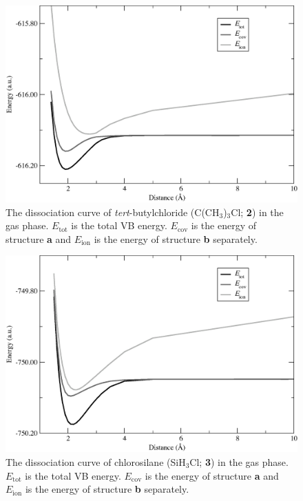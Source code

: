 \begin{figure}[hbtp]
\begin{center}
\includegraphics[scale=0.55]{dissociation/figures/c4h9cl_g.eps}
\end{center}
\caption{The dissociation curve of \textit{tert}-butylchloride (C(CH$_3$)$_3$Cl; \textbf{2}) in the gas phase. $E_\mathrm{tot}$ is the total VB energy. $E_\mathrm{cov}$ is the energy of structure \textbf{a} and $E_\mathrm{ion}$ is the energy of structure \textbf{b} separately. }
\label{ch3.fig.c4h9cl}
\end{figure}
\begin{figure}[htbp]
\begin{center}
\includegraphics[scale=0.55]{dissociation/figures/sih3cl_g.eps}
\end{center}
\caption{The dissociation curve of chlorosilane (SiH$_3$Cl; \textbf{3}) in the gas phase. $E_\mathrm{tot}$ is the total VB energy. $E_\mathrm{cov}$ is the energy of structure \textbf{a} and $E_\mathrm{ion}$ is the energy of structure \textbf{b} separately.}
\label{ch3.fig.sih3cl}
\end{figure}
